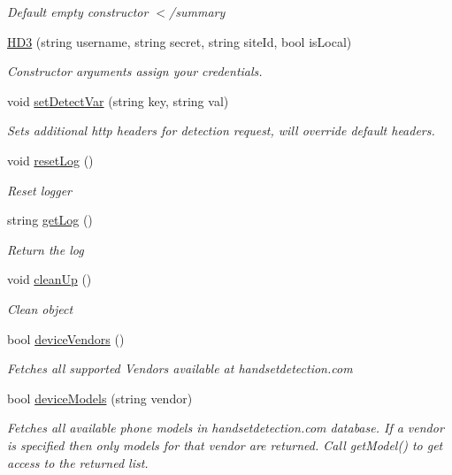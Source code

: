\begin{DoxyCompactItemize}
\begin{DoxyCompactList}\small\item\em Default empty constructor $<$/summary \end{DoxyCompactList}\item 
\hyperlink{class_h_d3_1_1_h_d3_aab536381ba3fffcd9cf449618b0829dd}{H\+D3} (string username, string secret, string site\+Id, bool is\+Local)
\begin{DoxyCompactList}\small\item\em Constructor arguments assign your credentials. \end{DoxyCompactList}\item 
void \hyperlink{class_h_d3_1_1_h_d3_a658104a63e4bac0a909cdcfed8c2d49b}{set\+Detect\+Var} (string key, string val)
\begin{DoxyCompactList}\small\item\em Sets additional http headers for detection request, will override default headers.\end{DoxyCompactList}\item 
void \hyperlink{class_h_d3_1_1_h_d3_a92e1a5bec8573497497bb7e4082a6b5c}{reset\+Log} ()
\begin{DoxyCompactList}\small\item\em Reset logger \end{DoxyCompactList}\item 
string \hyperlink{class_h_d3_1_1_h_d3_a2436e33681884291c6ad1b2ee112e17b}{get\+Log} ()
\begin{DoxyCompactList}\small\item\em Return the log \end{DoxyCompactList}\item 
void \hyperlink{class_h_d3_1_1_h_d3_a0431d69035a8245a195f9060d5525790}{clean\+Up} ()
\begin{DoxyCompactList}\small\item\em Clean object \end{DoxyCompactList}\item 
bool \hyperlink{class_h_d3_1_1_h_d3_aa2f63450321e2f47b2cb3baf8ff1a5e8}{device\+Vendors} ()
\begin{DoxyCompactList}\small\item\em Fetches all supported Vendors available at handsetdetection.\+com\end{DoxyCompactList}\item 
bool \hyperlink{class_h_d3_1_1_h_d3_a5af669048eb1d372a703dd53b242fe2f}{device\+Models} (string vendor)
\begin{DoxyCompactList}\small\item\em Fetches all available phone models in handsetdetection.\+com database. If a vendor is specified then only models for that vendor are returned. Call get\+Model() to get access to the returned list. \end{DoxyCompactList}\item 

\end{DoxyCompactItemize}
